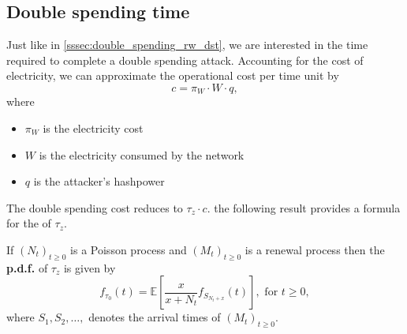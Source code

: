 \subsection{Double spending time}\label{ssec:double_spending_counting_process_dst}
Just like in \cref{sssec:double_spending_rw_dst}, we are interested in the time required to complete a double spending attack. Accounting for the cost of electricity, we can approximate the operational cost per time unit by 
$$
c = \pi_W\cdot W\cdot q,
$$
where 
\begin{itemize}
  \item $\pi_W$ is the electricity cost
  \item $W$ is the electricity consumed by the network
  \item  $q$ is the attacker's hashpower
\end{itemize}
The double spending cost reduces to $\tau_z\cdot c$. the following result provides a formula for the \pdf of $\tau_z$.
\begin{theo}
If $(N_t)_{t\geq0}$ is a Poisson process and $(M_t)_{t\geq0}$ is a renewal process then the \textbf{p.d.f.} of $\tau_z$ is given by
\begin{equation}\label{eq:DS_time_pdf}
f_{\tau_0}(t)=\mathbb{E}\left[\frac{x}{x+N_t}f_{S_{N_t+x}}(t)\right],\text{ for }t\geq0,
\end{equation}
where $S_1, S_2, \ldots, $ denotes the arrival times of $(M_t)_{t\geq 0}$.
\end{theo}
